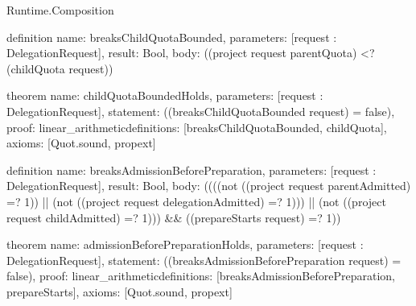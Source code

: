 \begin{lexlean}{Runtime.Composition}
\begin{semanticmodule}
definition{
  name: breaksChildQuotaBounded,
  parameters: [request : DelegationRequest],
  result: Bool,
  body: ((project request parentQuota) <? (childQuota request))
}

theorem{
  name: childQuotaBoundedHolds,
  parameters: [request : DelegationRequest],
  statement: ((breaksChildQuotaBounded request) = false),
  proof: linear_arithmetic{definitions: [breaksChildQuotaBounded, childQuota]},
  axioms: [Quot.sound, propext]
}

definition{
  name: breaksAdmissionBeforePreparation,
  parameters: [request : DelegationRequest],
  result: Bool,
  body: ((((not ((project request parentAdmitted) =? 1)) || (not ((project request delegationAdmitted) =? 1))) || (not ((project request childAdmitted) =? 1))) && ((prepareStarts request) =? 1))
}

theorem{
  name: admissionBeforePreparationHolds,
  parameters: [request : DelegationRequest],
  statement: ((breaksAdmissionBeforePreparation request) = false),
  proof: linear_arithmetic{definitions: [breaksAdmissionBeforePreparation, prepareStarts]},
  axioms: [Quot.sound, propext]
}
\end{semanticmodule}
\end{lexlean}
